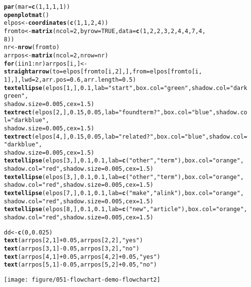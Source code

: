 \documentclass{article}\usepackage{graphicx, color}
\makeatletter
\def\maxwidth{ %
  \ifdim\Gin@nat@width>\linewidth
    \linewidth
  \else
    \Gin@nat@width
  \fi
}
\newcommand{\hlfunctioncall}[1]{\textcolor[rgb]{0.501960784313725,0,0.329411764705882}{\textbf{#1}}}%
\newcommand{\hlstring}[1]{\textcolor[rgb]{0.6,0.6,1}{#1}}%
\newenvironment{kframe}{%
 \def\at@end@of@kframe{}%
 \ifinner\ifhmode%
  \def\at@end@of@kframe{\end{minipage}}%
  \begin{minipage}{\columnwidth}%
 \fi\fi%
 \def\FrameCommand##1{\hskip\@totalleftmargin \hskip-\fboxsep
 \colorbox{shadecolor}{##1}\hskip-\fboxsep
     \hskip-\linewidth \hskip-\@totalleftmargin \hskip\columnwidth}%
 \MakeFramed {\advance\hsize-\width
   \@totalleftmargin\z@ \linewidth\hsize
   \@setminipage}}%
 {\par\unskip\endMakeFramed%
 \at@end@of@kframe}
\newenvironment{knitrout}{}{} %
\makeatother
\begin{document}
\begin{knitrout}
\begin{kframe}
\begin{alltt}
\hlfunctioncall{par}(mar = \hlfunctioncall{c}(1, 1, 1, 1))
\hlfunctioncall{openplotmat}()
elpos <- \hlfunctioncall{coordinates}(\hlfunctioncall{c}(1, 1, 2, 4))
fromto <- \hlfunctioncall{matrix}(ncol = 2, byrow = TRUE, data = \hlfunctioncall{c}(1, 2, 2, 3, 2, 4, 4, 7, 4, 
    8))
nr <- \hlfunctioncall{nrow}(fromto)
arrpos <- \hlfunctioncall{matrix}(ncol = 2, nrow = nr)
\hlfunctioncall{for} (i in 1:nr) arrpos[i, ] <- \hlfunctioncall{straightarrow}(to = elpos[fromto[i, 2], ], from = elpos[fromto[i, 
    1], ], lwd = 2, arr.pos = 0.6, arr.length = 0.5)
\hlfunctioncall{textellipse}(elpos[1, ], 0.1, lab = \hlstring{"start"}, box.col = \hlstring{"green"}, shadow.col = \hlstring{"darkgreen"}, 
    shadow.size = 0.005, cex = 1.5)
\hlfunctioncall{textrect}(elpos[2, ], 0.15, 0.05, lab = \hlstring{"found term?"}, box.col = \hlstring{"blue"}, shadow.col = \hlstring{"darkblue"}, 
    shadow.size = 0.005, cex = 1.5)
\hlfunctioncall{textrect}(elpos[4, ], 0.15, 0.05, lab = \hlstring{"related?"}, box.col = \hlstring{"blue"}, shadow.col = \hlstring{"darkblue"}, 
    shadow.size = 0.005, cex = 1.5)
\hlfunctioncall{textellipse}(elpos[3, ], 0.1, 0.1, lab = \hlfunctioncall{c}(\hlstring{"other"}, \hlstring{"term"}), box.col = \hlstring{"orange"}, 
    shadow.col = \hlstring{"red"}, shadow.size = 0.005, cex = 1.5)
\hlfunctioncall{textellipse}(elpos[3, ], 0.1, 0.1, lab = \hlfunctioncall{c}(\hlstring{"other"}, \hlstring{"term"}), box.col = \hlstring{"orange"}, 
    shadow.col = \hlstring{"red"}, shadow.size = 0.005, cex = 1.5)
\hlfunctioncall{textellipse}(elpos[7, ], 0.1, 0.1, lab = \hlfunctioncall{c}(\hlstring{"make"}, \hlstring{"a link"}), box.col = \hlstring{"orange"}, 
    shadow.col = \hlstring{"red"}, shadow.size = 0.005, cex = 1.5)
\hlfunctioncall{textellipse}(elpos[8, ], 0.1, 0.1, lab = \hlfunctioncall{c}(\hlstring{"new"}, \hlstring{"article"}), box.col = \hlstring{"orange"}, 
    shadow.col = \hlstring{"red"}, shadow.size = 0.005, cex = 1.5)

dd <- \hlfunctioncall{c}(0, 0.025)
\hlfunctioncall{text}(arrpos[2, 1] + 0.05, arrpos[2, 2], \hlstring{"yes"})
\hlfunctioncall{text}(arrpos[3, 1] - 0.05, arrpos[3, 2], \hlstring{"no"})
\hlfunctioncall{text}(arrpos[4, 1] + 0.05, arrpos[4, 2] + 0.05, \hlstring{"yes"})
\hlfunctioncall{text}(arrpos[5, 1] - 0.05, arrpos[5, 2] + 0.05, \hlstring{"no"})
\end{alltt}
\end{kframe}
\texttt{[image: figure/051-flowchart-demo-flowchart2]} 
\begin{kframe}\begin{alltt}



\end{alltt}
\end{kframe}
\end{knitrout}
\end{document}
